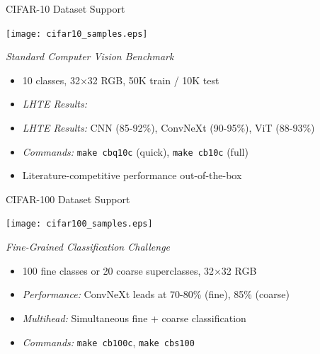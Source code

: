 \begin{slide}[\slideopts,toc={CIFAR-10}]{CIFAR-10 Dataset Support}
  
  \centerline{\texttt{[image: cifar10\_samples.eps]}}

  \emph{Standard Computer Vision Benchmark}
  
  \begin{itemize}
    \item 10 classes, 32×32 RGB, 50K train / 10K test
    
    \item \emph{LHTE Results:}
    \item \emph{LHTE Results:} CNN (85-92\%), ConvNeXt (90-95\%), ViT (88-93\%)
    
    \item \emph{Commands:} \texttt{make cbq10c} (quick), \quad \texttt{make cb10c} (full)
    
    \item Literature-competitive performance out-of-the-box
  \end{itemize}
  
\end{slide}

\begin{slide}[\slideopts,toc={CIFAR-100}]{CIFAR-100 Dataset Support}
  
  \centerline{\texttt{[image: cifar100\_samples.eps]}}

  \emph{Fine-Grained Classification Challenge}
  
  \begin{itemize}
    \item 100 fine classes or 20 coarse superclasses, 32×32 RGB
    
    \item \emph{Performance:} ConvNeXt leads at 70-80\% (fine), 85\% (coarse)
    
    \item \emph{Multihead:} Simultaneous fine + coarse classification
    
    \item \emph{Commands:} \texttt{make cb100c}, \quad \texttt{make cbs100}

  \end{itemize}
  
\end{slide}

